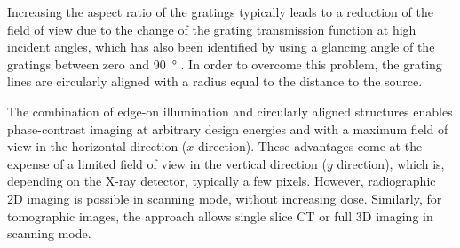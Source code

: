 \documentclass[aps,prl,preprint]{revtex4-1}
\begin{document}
Increasing the aspect ratio of the gratings typically leads to a
reduction of the field of view due to the change of the grating transmission
function at high incident angles, which has also been identified by using a
glancing angle of the gratings between zero and \SI{90}{\degree}
\cite{Stutman2012a}. In order to overcome this problem, the grating lines are circularly aligned 
with a radius equal to the distance to the source.

The combination of edge-on illumination and circularly aligned structures
enables phase-contrast imaging at arbitrary design energies and with a
maximum field of view in the horizontal direction ($x$ direction). These
advantages come at the expense of a limited field of view in the vertical
direction ($y$ direction), which is, depending on the X-ray detector,
typically a few pixels. However, radiographic 2D imaging is possible in
scanning mode, without increasing dose. Similarly, for tomographic images,
the approach allows single slice \ac{CT} or full 3D imaging in scanning mode.
\end{document}
